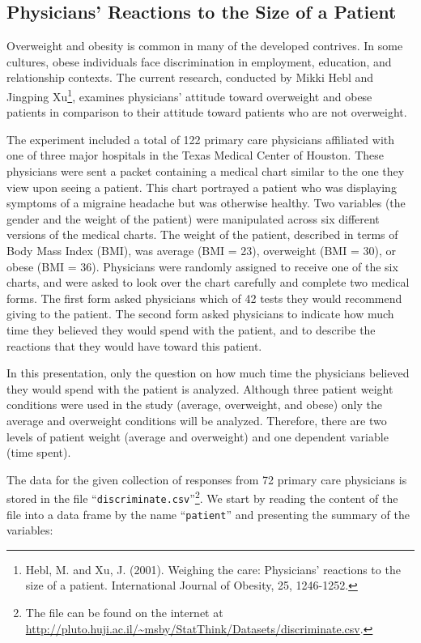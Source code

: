 \documentclass[]{krantz}
\theoremstyle{definition}
\theoremstyle{definition}
\theoremstyle{definition}
\theoremstyle{remark}
\begin{document}
\hypertarget{physicians-reactions-to-the-size-of-a-patient}{%
\subsection{Physicians' Reactions to the Size of a Patient}\label{physicians-reactions-to-the-size-of-a-patient}}

Overweight and obesity is common in many of the developed contrives. In
some cultures, obese individuals face discrimination in employment,
education, and relationship contexts. The current research, conducted by
Mikki Hebl and Jingping Xu\footnote{Hebl, M. and Xu, J. (2001). Weighing the care: Physicians'
  reactions to the size of a patient. International Journal of
  Obesity, 25, 1246-1252.}, examines physicians' attitude toward
overweight and obese patients in comparison to their attitude toward
patients who are not overweight.

The experiment included a total of 122 primary care physicians
affiliated with one of three major hospitals in the Texas Medical Center
of Houston. These physicians were sent a packet containing a medical
chart similar to the one they view upon seeing a patient. This chart
portrayed a patient who was displaying symptoms of a migraine headache
but was otherwise healthy. Two variables (the gender and the weight of
the patient) were manipulated across six different versions of the
medical charts. The weight of the patient, described in terms of Body
Mass Index (BMI), was average (BMI = 23), overweight (BMI = 30), or
obese (BMI = 36). Physicians were randomly assigned to receive one of
the six charts, and were asked to look over the chart carefully and
complete two medical forms. The first form asked physicians which of 42
tests they would recommend giving to the patient. The second form asked
physicians to indicate how much time they believed they would spend with
the patient, and to describe the reactions that they would have toward
this patient.

In this presentation, only the question on how much time the physicians
believed they would spend with the patient is analyzed. Although three
patient weight conditions were used in the study (average, overweight,
and obese) only the average and overweight conditions will be analyzed.
Therefore, there are two levels of patient weight (average and
overweight) and one dependent variable (time spent).

The data for the given collection of responses from 72 primary care
physicians is stored in the file ``\texttt{discriminate.csv}''\footnote{The file can be found on the internet at
  \url{http://pluto.huji.ac.il/~msby/StatThink/Datasets/discriminate.csv}.}. We start by
reading the content of the file into a data frame by the name
``\texttt{patient}'' and presenting the summary of the variables:
\end{document}
